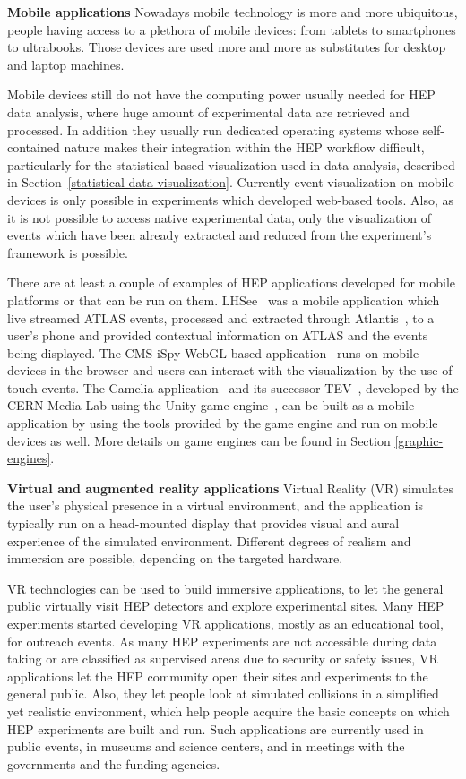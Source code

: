 \documentclass[12pt,a4paper]{article}
\begin{document}
{\bf Mobile applications} Nowadays mobile technology is more and more ubiquitous, people having access to a plethora of mobile devices: from tablets to
smartphones to ultrabooks. Those devices are used more and more as substitutes for desktop and laptop machines.


Mobile devices still do not have the computing power usually needed for HEP data analysis, where huge amount of experimental data
are retrieved and processed. In addition they usually run dedicated operating systems whose self-contained nature
makes their integration within the HEP workflow difficult, particularly for the statistical-based visualization used in
data analysis, described in Section~\ref{statistical-data-visualization}. Currently event visualization on mobile devices is only
possible in experiments which developed web-based tools. Also, as it is not possible to access  native experimental data, only the visualization of events which have been already
extracted and reduced from the experiment's framework is possible.

There are at least a couple of examples of HEP applications developed for mobile platforms or that can be run on them. LHSee~\cite{LHSee}
was a mobile application which live streamed ATLAS events, processed and extracted through Atlantis~\cite{ATLASAtlantis}, to a user’s phone and provided contextual information on ATLAS and the
events being displayed. The CMS iSpy WebGL-based application~\cite{CMSISpyWebGL} runs on mobile devices in the browser and users can interact
with the visualization by the use of touch events. The Camelia application~\cite{CERNCamelia} and its successor TEV~\cite{CERNTEV}, developed by the
CERN Media Lab using the Unity game engine~\cite{Unity3D}, can be built as a mobile application by using the tools provided by the game engine and run on mobile devices as well. More details on game engines can be found in Section \ref{graphic-engines}.

{\bf Virtual and augmented reality applications} Virtual Reality (VR) simulates the user’s physical presence in a virtual environment, and the application is typically run on a head-mounted display that provides visual and aural experience of the simulated environment. Different degrees of realism and immersion are possible, depending on the targeted hardware.

VR technologies can be used to build immersive applications, to let the general public virtually visit HEP detectors and explore experimental sites. Many HEP experiments started developing VR applications, mostly as an educational tool, for outreach events. As many HEP experiments are not accessible during data taking or are classified as supervised areas due to security or safety issues, VR applications let the HEP community open their sites and experiments to the general public. Also, they let people look at simulated  collisions in a simplified yet realistic environment, which help people acquire the basic concepts on which HEP experiments are built and run. Such applications are currently used in public events, in museums and science centers, and in meetings with the governments and the funding agencies.
\end{document}
